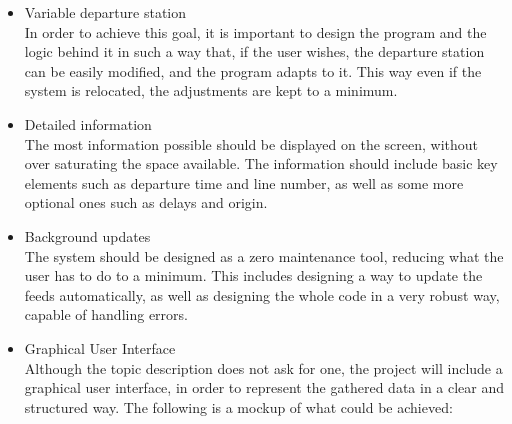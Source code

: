 \documentclass[a4paper]{article}
\begin{document}
\begin{itemize}
\item Variable departure station\\ In order to achieve this goal, it is important to design the program and the logic behind it in such a way that, if the user wishes, the departure station can be easily modified, and the program adapts to it. This way even if the system is relocated, the adjustments are kept to a minimum.
\item Detailed information\\ The most information possible should be displayed on the screen, without over saturating the space available. The information should include basic key elements such as departure time and line number, as well as some more optional ones such as delays and origin. 
\item Background updates\\
The system should be designed as a zero maintenance tool, reducing what the user has to do to a minimum. This includes designing a way to update the feeds automatically, as well as designing the whole code in a very robust way, capable of handling errors.

\item Graphical User Interface\\
Although the topic description does not ask for one, the project will include a graphical user interface, in order to represent the gathered data in a clear and structured way. The following is a mockup of what could be achieved:\\

\begin{center}
\end{center}
\end{itemize}
\end{document}
